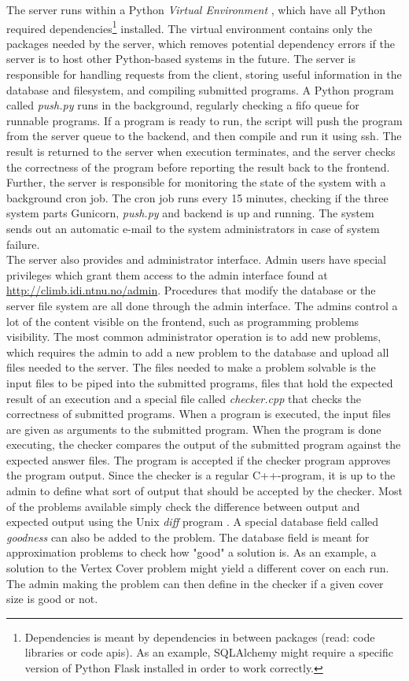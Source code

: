 The server runs within a Python \textit{Virtual Environment} \cite{VIRTUALENV}, which have all Python required dependencies\footnote{Dependencies is meant by dependencies in between packages (read: code libraries or code \gls{api}s). As an example, SQLAlchemy might require a specific version of Python Flask installed in order to work correctly.} installed. The virtual environment contains only the packages needed by the server, which removes potential dependency errors if the server is to host other Python-based systems in the future. The server is responsible for handling requests from the client, storing useful information in the database and filesystem, and compiling submitted programs. A Python program called \textit{push.py} runs in the background, regularly checking a \gls{fifo} queue for runnable programs. If a program is ready to run, the script will push the program from the server queue to the backend, and then compile and run it using \gls{ssh}. The result is returned to the server when execution terminates, and the server checks the correctness of the program before reporting the result back to the frontend. Further, the server is responsible for monitoring the state of the system with a background cron job. The cron job runs every 15 minutes, checking if the three system parts Gunicorn, \textit{push.py} and backend is up and running. The system sends out an automatic e-mail to the system administrators in case of system failure. \\

The server also provides and administrator interface. Admin users have special privileges which grant them access to the admin interface found at \url{http://climb.idi.ntnu.no/admin}. Procedures that modify the database or the server file system are all done through the admin interface. The admins control a lot of the content visible on the frontend, such as programming problems visibility. The most common administrator operation is to add new problems, which requires the admin to add a new problem to the database and upload all files needed to the server. The files needed to make a problem solvable is the input files to be piped into the submitted programs, files that hold the expected result of an execution and a special file called \textit{checker.cpp} that checks the correctness of submitted programs. When a program is executed, the input files are given as arguments to the submitted program. When the program is done executing, the checker compares the output of the submitted program against the expected answer files. The program is accepted if the checker program approves the program output. Since the checker is a regular C++-program, it is up to the admin to define what sort of output that should be accepted by the checker. Most of the problems available simply check the difference between output and expected output using the Unix \textit{diff} program \cite{DIFF}. A special database field called \textit{goodness} can also be added to the problem. The database field is meant for approximation problems to check how "good" a solution is. As an example, a solution to the Vertex Cover problem might yield a different cover on each run. The admin making the problem can then define in the checker if a given cover size is good or not.


